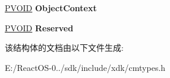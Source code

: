 \begin{DoxyCompactItemize}
\item 
\mbox{\label{struct___r_e_g___e_n_u_m_e_r_a_t_e___v_a_l_u_e___k_e_y___i_n_f_o_r_m_a_t_i_o_n_aaae3e7ce2dfd5057cd2b3f03644114af}} 
\hyperlink{interfacevoid}{P\+V\+O\+ID} {\bfseries Object\+Context}
\item 
\mbox{\label{struct___r_e_g___e_n_u_m_e_r_a_t_e___v_a_l_u_e___k_e_y___i_n_f_o_r_m_a_t_i_o_n_a2417a9dd73c256893c43d5978dc6bc6f}} 
\hyperlink{interfacevoid}{P\+V\+O\+ID} {\bfseries Reserved}
\end{DoxyCompactItemize}


该结构体的文档由以下文件生成\+:\begin{DoxyCompactItemize}
\item 
E\+:/\+React\+O\+S-\/0../sdk/include/xdk/cmtypes.\+h\end{DoxyCompactItemize}
